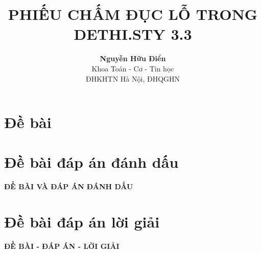 \documentclass[12pt]{article}
\begin{document}
\title{\bf PHIẾU CHẤM ĐỤC LỖ TRONG DETHI.STY 3.3} %
\author{{\bf Nguyễn Hữu Điển}\\
Khoa Toán - Cơ - Tin học\\
ĐHKHTN Hà Nội, ĐHQGHN
} %
\date{} %

\maketitle
\vspace*{1cm}

\tableofcontents
\setlength{\baselineskip}{12truept}
\def\v#1{\overrightarrow{#1}} %

 \setlength{\shortitemwidth}{\textwidth/4-3em}
 \setlength{\runitemsep}{1ex}
 \setlength{\labelsep}{4pt}


\newpage
\section{Đề bài}
\indebai
{}
\lamtieude
\begin{enumerate}[]
\foreachproblem[bttracnghiem]{\item\causo\thisproblem}
\end{enumerate}
\label{debaiPage}

\newpage
\section{Đề bài đáp án đánh dấu}
\setcounter{page}{1}
\indebaidapan
{}
\lamtieude
\begin{center}
{\bf ĐỀ BÀI VÀ ĐÁP ÁN ĐÁNH DẤU}
\end{center}
\begin{enumerate}[]
\foreachproblem[bttracnghiem]{\item\causo\thisproblem}
\end{enumerate}
\label{danhdauPage}
\newpage
\section{Đề bài đáp án lời giải}
\setcounter{page}{1}
\indebailoigiai
{}
\lamtieude
\begin{center}
{\bf ĐỀ BÀI - ĐÁP ÁN - LỜI GIẢI}
\end{center}
\begin{enumerate}[]
\foreachproblem[bttracnghiem]{\item\causo\thisproblem}
\end{enumerate}
\label{dblgPage}
\end{document}
